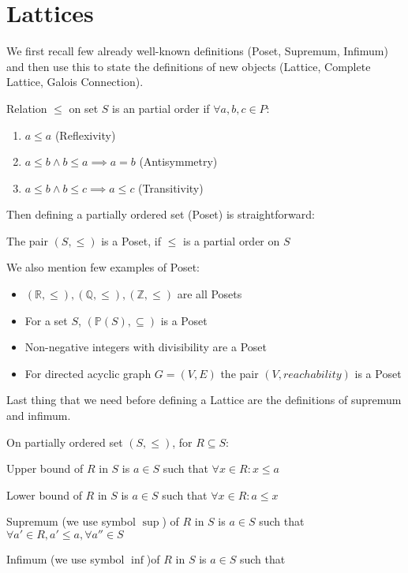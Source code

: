 \section{Lattices} %

We first recall few already well-known definitions (Poset, Supremum, Infimum) and then use this
to state the definitions of new objects (Lattice, Complete Lattice, Galois Connection).

\begin{defn}
    Relation $\leq$ on set $S$ is an partial order if $\forall a, b, c \in P$:
    \begin{enumerate}
        \item $a \leq a$ (Reflexivity)
        \item $a \leq b \land b \leq a \implies a = b$ (Antisymmetry)
        \item $a \leq b \land b \leq c \implies a \leq c$ (Transitivity)
    \end{enumerate}
\end{defn}

Then defining a partially ordered set (Poset) is straightforward:

\begin{defn}[Poset]
    The pair $(S, \leq)$ is a Poset, if $\leq$ is a partial order on $S$
\end{defn}

\begin{example}
    We also mention few examples of Poset:
    \begin{itemize}
        \item $(\mathbb{R}, \leq), (\mathbb{Q}, \leq), (\mathbb{Z}, \leq)$ are all Posets
        \item For a set $S$, $(\mathbb{P}(S), \subseteq)$ is a Poset
        \item Non-negative integers with divisibility are a Poset
        \item For directed acyclic graph $G=(V,E)$ the pair $(V, reachability)$ is a Poset
    \end{itemize}
\end{example}

Last thing that we need before defining a Lattice are the definitions of supremum and infimum.

\begin{defn}
    On partially ordered set $(S, \leq)$, for $R \subseteq S$:

    Upper bound of $R$ in $S$ is $a \in S$ such that $\forall x \in R: x \leq a$

    Lower bound of $R$ in $S$ is $a \in S$ such that $\forall x \in R: a \leq x$

    Supremum (we use symbol $\sup$) of $R$ in $S$ is $a \in S$
    such that $\forall a' \in R, a' \leq a, \forall a'' \in S$ %

    Infimum (we use symbol $\inf$)of $R$ in $S$ is $a \in S$ such that
\end{defn}

